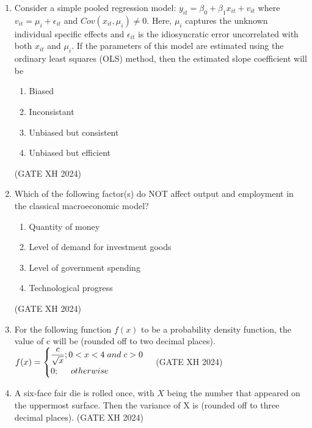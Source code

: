 \documentclass{article}
\begin{document}
\begin{enumerate}
    \item Consider a simple pooled regression model: $y_{it}=\beta_0+\beta_1x_{it}+v_{it}$ where $v_{it}=\mu_i+\epsilon_{it}$ and $Cov(x_{it},\mu_i)\neq0$. Here, $\mu_i$ captures the unknown individual specific effects and $\epsilon_{it}$ is the idiosyncratic error uncorrelated with both $x_{it}$ and $\mu_i$. If the parameters of this model are estimated using the ordinary least squares (OLS) method, then the estimated slope coefficient will be

    \begin{multicols}{2}
    \begin{enumerate}
        \item Biased
        \item Inconsistant
        \item Unbiased but consistent
        \item Unbiased but efficient
    \end{enumerate}
    \end{multicols} \hfill (GATE XH 2024)

    \item Which of the following factor(s) do NOT affect output and employment in the classical macroeconomic model?

    \begin{multicols}{2}
    \begin{enumerate}
        \item Quantity of money
        \item Level of demand for investment goods
        \item Level of government spending
        \item Technological progress
    \end{enumerate}
    \end{multicols} \hfill (GATE XH 2024)

    \item For the following function $f(x)$ to be a probability density function, the value of c will be \makebox[1cm]{\hrulefill} (rounded off to two decimal places).
    $f(x)=\begin{cases}\dfrac{c}{\sqrt{x}};0<x<4 \hspace{0.1cm}and\hspace{0.1cm} c>0 \\ 0;\hspace{0.5cm} otherwise
    \end{cases}$ \hfill (GATE XH 2024)

    \item A six-face fair die is rolled once, with $X$ being the number that appeared on the uppermost surface. Then the variance of X is \makebox[1cm]{\hrulefill} (rounded off to three decimal places). \hfill (GATE XH 2024)


\end{enumerate}
\end{document}
